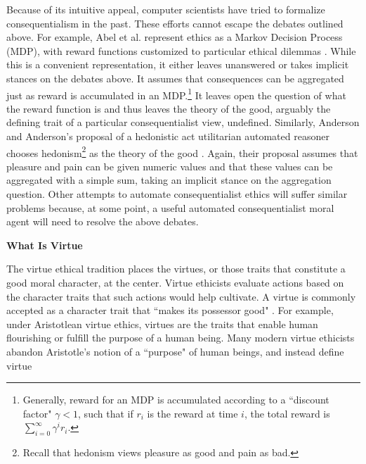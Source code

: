 \begin{isabellebody}
\begin{isamarkuptext}
Because of its intuitive appeal, computer scientists have tried to formalize consequentialism in the past.
These efforts cannot escape the debates outlined above. For example, Abel et al. represent ethics as a
Markov Decision Process (MDP), with reward functions customized to particular ethical dilemmas 
\citep[3]{util1}. While this is a convenient representation, it either leaves unanswered or 
takes implicit stances on the debates above. It assumes that consequences can be aggregated just as 
reward is accumulated in an MDP.\footnote{Generally, reward for an MDP is accumulated according to a 
``discount factor" $\gamma < 1$, such that if $r_i$ is the reward at time $i$, the total reward is $\sum_{i=0}^{\infty}\gamma^i r_i$.} 
It leaves open the question of what the reward function is and thus 
leaves the theory of the good, arguably the defining trait of a particular consequentialist view, 
undefined. Similarly, Anderson and Anderson's proposal of a hedonistic act 
utilitarian automated reasoner chooses hedonism\footnote{Recall that hedonism views pleasure as good
and pain as bad.} as the theory of the good \citep[2]{util2}. Again, their proposal assumes that pleasure and pain can be 
given numeric values and that these values can be aggregated with a simple sum, taking an implicit
stance on the aggregation question. Other attempts to automate consequentialist ethics will suffer 
similar problems because, at some point, a useful automated consequentialist moral agent will need 
to resolve the above debates.%
\end{isamarkuptext}\isamarkuptrue%
%
\isadelimdocument
%
\endisadelimdocument
%
\isatagdocument
%
\isamarkuptrue%
%
\endisatagdocument
{\isafolddocument}%
%
\isadelimdocument
%
\endisadelimdocument
%
\begin{isamarkuptext}%
\textbf{What Is Virtue}%
\end{isamarkuptext}\isamarkuptrue%
%
\begin{isamarkuptext}%
The virtue ethical tradition places the virtues, or those traits that constitute a 
good moral character, at the center. Virtue ethicists evaluate actions based on the character traits 
that such actions would help cultivate. A virtue is commonly accepted as a character trait that 
``makes its possessor good" \citep{vesep}. For example, under Aristotlean virtue ethics, virtues 
are the traits that enable human flourishing or fulfill the purpose of a human being. Many modern 
virtue ethicists abandon Aristotle's notion of a ``purpose" of human beings, and instead define virtue 

\end{isamarkuptext}
\end{isabellebody}
